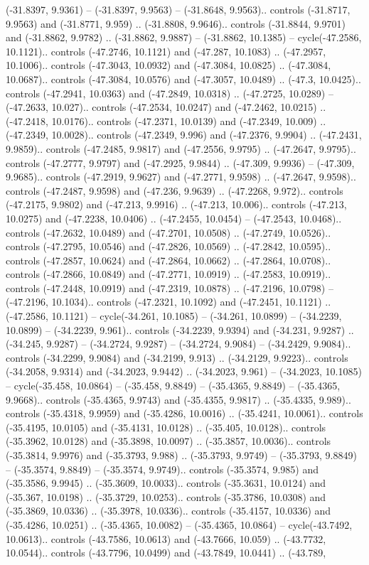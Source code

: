 \begin{scope}[shift={(2.5552, 9.9912)}]
\begin{scope}[shift={(48.1654, -14.8546)}]
(-31.8397, 9.9361) -- (-31.8397, 9.9563) -- (-31.8648, 9.9563).. controls (-31.8717, 9.9563) and (-31.8771, 9.959) .. (-31.8808, 9.9646).. controls (-31.8844, 9.9701) and (-31.8862, 9.9782) .. (-31.8862, 9.9887) -- (-31.8862, 10.1385) -- cycle(-47.2586, 10.1121).. controls (-47.2746, 10.1121) and (-47.287, 10.1083) .. (-47.2957, 10.1006).. controls (-47.3043, 10.0932) and (-47.3084, 10.0825) .. (-47.3084, 10.0687).. controls (-47.3084, 10.0576) and (-47.3057, 10.0489) .. (-47.3, 10.0425).. controls (-47.2941, 10.0363) and (-47.2849, 10.0318) .. (-47.2725, 10.0289) -- (-47.2633, 10.027).. controls (-47.2534, 10.0247) and (-47.2462, 10.0215) .. (-47.2418, 10.0176).. controls (-47.2371, 10.0139) and (-47.2349, 10.009) .. (-47.2349, 10.0028).. controls (-47.2349, 9.996) and (-47.2376, 9.9904) .. (-47.2431, 9.9859).. controls (-47.2485, 9.9817) and (-47.2556, 9.9795) .. (-47.2647, 9.9795).. controls (-47.2777, 9.9797) and (-47.2925, 9.9844) .. (-47.309, 9.9936) -- (-47.309, 9.9685).. controls (-47.2919, 9.9627) and (-47.2771, 9.9598) .. (-47.2647, 9.9598).. controls (-47.2487, 9.9598) and (-47.236, 9.9639) .. (-47.2268, 9.972).. controls (-47.2175, 9.9802) and (-47.213, 9.9916) .. (-47.213, 10.006).. controls (-47.213, 10.0275) and (-47.2238, 10.0406) .. (-47.2455, 10.0454) -- (-47.2543, 10.0468).. controls (-47.2632, 10.0489) and (-47.2701, 10.0508) .. (-47.2749, 10.0526).. controls (-47.2795, 10.0546) and (-47.2826, 10.0569) .. (-47.2842, 10.0595).. controls (-47.2857, 10.0624) and (-47.2864, 10.0662) .. (-47.2864, 10.0708).. controls (-47.2866, 10.0849) and (-47.2771, 10.0919) .. (-47.2583, 10.0919).. controls (-47.2448, 10.0919) and (-47.2319, 10.0878) .. (-47.2196, 10.0798) -- (-47.2196, 10.1034).. controls (-47.2321, 10.1092) and (-47.2451, 10.1121) .. (-47.2586, 10.1121) -- cycle(-34.261, 10.1085) -- (-34.261, 10.0899) -- (-34.2239, 10.0899) -- (-34.2239, 9.961).. controls (-34.2239, 9.9394) and (-34.231, 9.9287) .. (-34.245, 9.9287) -- (-34.2724, 9.9287) -- (-34.2724, 9.9084) -- (-34.2429, 9.9084).. controls (-34.2299, 9.9084) and (-34.2199, 9.913) .. (-34.2129, 9.9223).. controls (-34.2058, 9.9314) and (-34.2023, 9.9442) .. (-34.2023, 9.961) -- (-34.2023, 10.1085) -- cycle(-35.458, 10.0864) -- (-35.458, 9.8849) -- (-35.4365, 9.8849) -- (-35.4365, 9.9668).. controls (-35.4365, 9.9743) and (-35.4355, 9.9817) .. (-35.4335, 9.989).. controls (-35.4318, 9.9959) and (-35.4286, 10.0016) .. (-35.4241, 10.0061).. controls (-35.4195, 10.0105) and (-35.4131, 10.0128) .. (-35.405, 10.0128).. controls (-35.3962, 10.0128) and (-35.3898, 10.0097) .. (-35.3857, 10.0036).. controls (-35.3814, 9.9976) and (-35.3793, 9.988) .. (-35.3793, 9.9749) -- (-35.3793, 9.8849) -- (-35.3574, 9.8849) -- (-35.3574, 9.9749).. controls (-35.3574, 9.985) and (-35.3586, 9.9945) .. (-35.3609, 10.0033).. controls (-35.3631, 10.0124) and (-35.367, 10.0198) .. (-35.3729, 10.0253).. controls (-35.3786, 10.0308) and (-35.3869, 10.0336) .. (-35.3978, 10.0336).. controls (-35.4157, 10.0336) and (-35.4286, 10.0251) .. (-35.4365, 10.0082) -- (-35.4365, 10.0864) -- cycle(-43.7492, 10.0613).. controls (-43.7586, 10.0613) and (-43.7666, 10.059) .. (-43.7732, 10.0544).. controls (-43.7796, 10.0499) and (-43.7849, 10.0441) .. (-43.789, 
\end{scope}
\end{scope}
